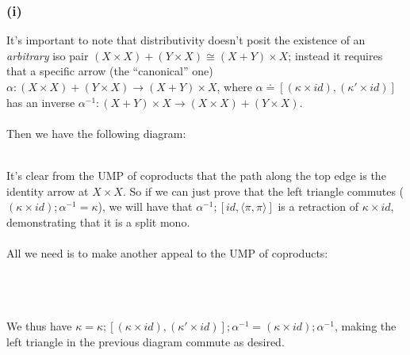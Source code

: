 \documentclass{article}
\begin{document}
\subsubsection*{(i)}

It's important to note that distributivity doesn't posit the existence of an \emph{arbitrary} iso pair 
$(X \times X) + (Y \times X) \cong (X + Y) \times X$; instead it requires that a specific arrow (the ``canonical'' one)
$\alpha : (X \times X) + (Y \times X) \to (X + Y) \times X$, where 
$\alpha \doteq [(\kappa \times id), (\kappa' \times id)]$ has an inverse $\alpha^{-1} : (X  + Y) \times X \to (X \times X) + (Y \times X)$.\\~\\
Then we have the following diagram:\\~\\

It's clear from the UMP of coproducts that the path along the top edge is the identity arrow at $X \times X$.
So if we can just prove that the left triangle commutes ($(\kappa \times id);\alpha^{-1} = \kappa$), 
we will have that $\alpha^{-1};[id,\langle \pi,\pi\rangle]$ is a retraction of $\kappa \times id$,
demonstrating that it is a split mono.\\~\\
All we need is to make another appeal to the UMP of coproducts:\\~\\
\\~\\
We thus have $\kappa = \kappa;[(\kappa \times id), (\kappa' \times id)];\alpha^{-1} = (\kappa \times id);\alpha^{-1}$,
making the left triangle in the previous diagram commute as desired.
\end{document}
